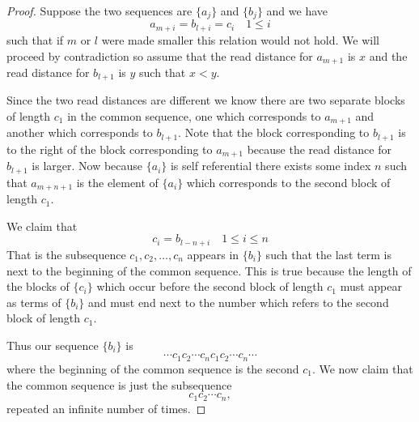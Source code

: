 \documentclass[runningheads,a4paper]{llncs}
\begin{document}
\begin{proof}
Suppose the two sequences are $\{a_j\}$ and $\{b_j\}$ and we have 
\begin{equation*}
a_{m+i} = b_{l+i} = c_{i} \quad 1 \leq i
\end{equation*}
such that if $m$ or $l$ were made smaller this relation would not hold. We will proceed by contradiction so assume that the read distance for $a_{m+1}$ is $x$ and the read distance for $b_{l+1}$ is $y$ such that $x<y$.


Since the two read distances are different we know there are two separate blocks of length $c_1$ in the common sequence, one which corresponds to $a_{m+1}$ and another which corresponds to $b_{l+1}$. Note that the block corresponding to $b_{l+1}$ is to the right of the block corresponding to $a_{m+1}$ because the read distance for $b_{l+1}$ is larger. Now because $\{a_i\}$ is self referential there exists some index $n$ such that $a_{m+n+1}$ is the element of $\{a_i\}$ which corresponds to the second block of length $c_1$. 

We claim that
\begin{equation*}
c_i = b_{l-n+i} \quad 1 \leq i \leq n
\end{equation*}
That is the subsequence $c_1, c_2, \ldots, c_{n}$ appears in $\{b_i\}$ such that the last term is next to the beginning of the common sequence. This is true because the length of the blocks of $\{c_i\}$ which occur before the second block of length $c_1$ must appear as terms of $\{b_i\}$ and must end next to the number which refers to the second block of length $c_1$.

Thus our sequence $\{b_i\}$ is  
\begin{equation*}
\cdots c_1 c_2 \cdots c_{n} c_1 c_2 \cdots c_n \cdots
\end{equation*}
where the beginning of the common sequence is the second $c_1$. We now claim that the common sequence is just the subsequence
\begin{equation*}
c_1 c_2 \cdots c_n,
\end{equation*}
repeated an infinite number of times. 


\end{proof}
\end{document}

